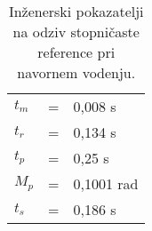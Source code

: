 \begin{table}[!h]
	\centering
	\begin{footnotesize}
		\begin{tabular}{|l c l|}
		\hline
		$ t_m $ & = & 0,008 s\\
		$ t_r $ & = & 0,134 s\\
		$ t_p $ & = & 0,25 s\\
		$ M_p $ & = & 0,1001 rad\\
		$ t_s $ & = & 0,186 s\\
		\hline
		\end{tabular}
	\end{footnotesize}
	\caption{In\v{z}enerski pokazatelji na odziv stopni\v{c}aste reference pri navornem vodenju.}
	\label{table:tq_step}
\end{table}
